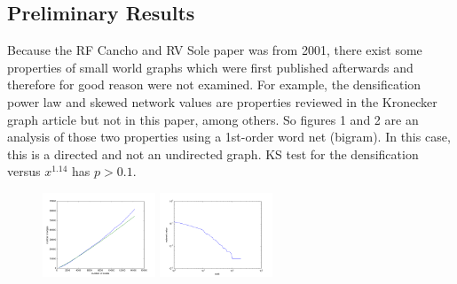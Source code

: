\documentclass[12pt]{article}
\begin{document}
\subsection{Preliminary Results}

Because the RF Cancho and RV Sole paper was from 2001, there exist some properties of small world graphs which were first published afterwards and therefore for good reason were not examined. For example, the densification power law\cite{densificationpowerlaw} and skewed network values\cite{netvalskew} are properties reviewed in the Kronecker graph article but not in this paper, among others. So figures 1 and 2 are an analysis of those two properties using a 1st-order word net (bigram). In this case, this is a directed and not an undirected graph. KS test for the densification versus $x^{1.14}$ has $p>0.1$. %

\begin{figure}
  \includegraphics[width=0.3\textwidth]{densification_plot.png}
  \includegraphics[width=0.3\textwidth]{eigenvector_loglog.png}
  \caption{} %
\end{figure}

\end{document}

